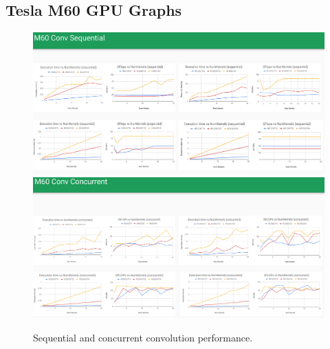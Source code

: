 \documentclass[sigconf]{acmart}
\begin{document}
\newpage~\newpage
\subsection{Tesla M60 GPU Graphs}
\begin{figure}[htb]
  \centering
  \includegraphics[width=\textwidth]{img/m60-seq-conv}
  \includegraphics[width=\textwidth]{img/m60-conc-conv}
  \caption{Sequential and concurrent convolution performance.}
\end{figure}
\end{document}
